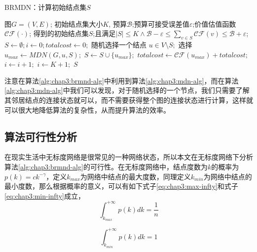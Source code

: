 \begin{algorithm}
\caption{BRMDN：计算初始结点集$S$}
\label{alg:chap3:brmnd-alg}
\begin{algorithmic}
\REQUIRE 图$G=(V,E)$; 初始结点集大小$K$, 预算$\mathcal{B}$;预算可接受误差值$\varepsilon$;价值估值函数$\mathcal{CF}(\cdot)$;
\ENSURE 得到的初始结点集$S$;且满足$|S| \leq K \wedge \mathcal{B} - \varepsilon \leq \sum_{v \in S}\mathcal{CF}(v) \leq \mathcal{B} + \varepsilon$;
\STATE $S \leftarrow \emptyset; i \leftarrow 0; totalcost \leftarrow 0;$
	\STATE 随机选择一个结点 $u \in V \setminus S;$
	\STATE 选择$u_{max} \leftarrow MDN(G, u, S);$
		\STATE $S \leftarrow S \cup \{u_{max}\};$
		\STATE $totalcost \leftarrow \mathcal{CF}(u_{max}) + totalcost;$
		\STATE $i \leftarrow i + 1;$
			\STATE $ i \leftarrow K + 1;$
		\ENDIF
	\ENDIF
\ENDWHILE
\RETURN $S$
\end{algorithmic}
\end{algorithm}


注意在算法\ref{alg:chap3:brmnd-alg}中利用到算法\ref{alg:chap3:mdn-alg}，而在算法\ref{alg:chap3:mdn-alg}中我们可以发现，对于随机选择的一个节点，我们只需要了解其邻居结点的连接状态就可以，而不需要获得整个图的连接状态进行计算，这样就可以很大地降低算法的复杂性，从而提升算法的效率。


\subsection{算法可行性分析}
\label{sec:chap3:feasibility-analysis}
在现实生活中无标度网络是很常见的一种网络状态，所以本文在无标度网络下分析算法\ref{alg:chap3:brmnd-alg}的可行性。在无标度网络中，结点度数为$k$的概率为$p(k)=ck^{-\gamma}$，定义$k_{max}$为网络中结点的最大度数，同理定义$k_{min}$为网络中结点的最小度数，那么根据概率的意义，可以有如下式子\ref{eq:chap3:max-infty}和式子\ref{eq:chap3:min-infty}成立，
\begin{equation}
\label{eq:chap3:max-infty}
\int_{k_{max}}^{+\infty}p(k) dk = \frac{1}{n}
\end{equation}

\begin{equation}
\label{eq:chap3:min-infty}
\int_{k_{min}}^{+\infty}p(k) dk = 1
\end{equation}

